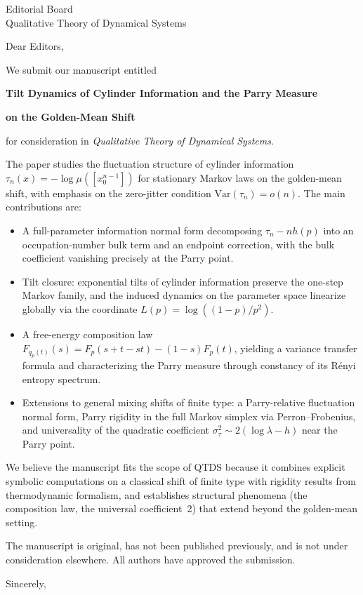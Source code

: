 \documentclass[11pt]{letter}
\date{\today}
\begin{document}
\begin{letter}{Editorial Board\\Qualitative Theory of Dynamical Systems}

\opening{Dear Editors,}

We submit our manuscript entitled

\medskip
\centerline{\textbf{Tilt Dynamics of Cylinder Information and the Parry Measure}}
\centerline{\textbf{on the Golden-Mean Shift}}
\medskip

\noindent for consideration in \textit{Qualitative Theory of Dynamical Systems}.

The paper studies the fluctuation structure of cylinder information $\tau_n(x)=-\log\mu([x_0^{n-1}])$ for stationary Markov laws on the golden-mean shift, with emphasis on the zero-jitter condition $\mathrm{Var}(\tau_n)=o(n)$. The main contributions are:

\begin{itemize}
\item A full-parameter information normal form decomposing $\tau_n - nh(p)$ into an occupation-number bulk term and an endpoint correction, with the bulk coefficient vanishing precisely at the Parry point.

\item Tilt closure: exponential tilts of cylinder information preserve the one-step Markov family, and the induced dynamics on the parameter space linearize globally via the coordinate $L(p)=\log((1-p)/p^2)$.

\item A free-energy composition law $F_{q_p(t)}(s)=F_p(s+t-st)-(1-s)F_p(t)$, yielding a variance transfer formula and characterizing the Parry measure through constancy of its R\'enyi entropy spectrum.

\item Extensions to general mixing shifts of finite type: a Parry-relative fluctuation normal form, Parry rigidity in the full Markov simplex via Perron--Frobenius, and universality of the quadratic coefficient $\sigma_\tau^2 \sim 2(\log\lambda - h)$ near the Parry point.
\end{itemize}

We believe the manuscript fits the scope of QTDS because it combines explicit symbolic computations on a classical shift of finite type with rigidity results from thermodynamic formalism, and establishes structural phenomena (the composition law, the universal coefficient~2) that extend beyond the golden-mean setting.

The manuscript is original, has not been published previously, and is not under consideration elsewhere. All authors have approved the submission.

\closing{Sincerely,}

\end{letter}
\end{document}
